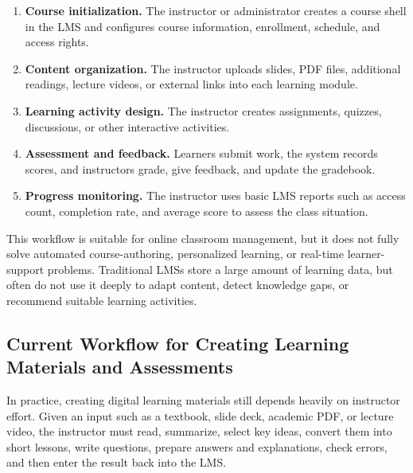 \begin{enumerate}
    \item \textbf{Course initialization.} The instructor or administrator
          creates a course shell in the LMS and configures course information,
          enrollment, schedule, and access rights.
    \item \textbf{Content organization.} The instructor uploads slides, PDF
          files, additional readings, lecture videos, or external links into
          each learning module.
    \item \textbf{Learning activity design.} The instructor creates
          assignments, quizzes, discussions, or other interactive activities.
    \item \textbf{Assessment and feedback.} Learners submit work, the system
          records scores, and instructors grade, give feedback, and update the
          gradebook.
    \item \textbf{Progress monitoring.} The instructor uses basic LMS reports
          such as access count, completion rate, and average score to assess
          the class situation.
\end{enumerate}

This workflow is suitable for online classroom management, but it does not
fully solve automated course-authoring, personalized learning, or real-time
learner-support problems. Traditional LMSs store a large amount of learning
data, but often do not use it deeply to adapt content, detect knowledge gaps,
or recommend suitable learning activities.

\subsection{Current Workflow for Creating Learning Materials and Assessments}

In practice, creating digital learning materials still depends heavily on
instructor effort. Given an input such as a textbook, slide deck, academic PDF,
or lecture video, the instructor must read, summarize, select key ideas,
convert them into short lessons, write questions, prepare answers and
explanations, check errors, and then enter the result back into the LMS.

